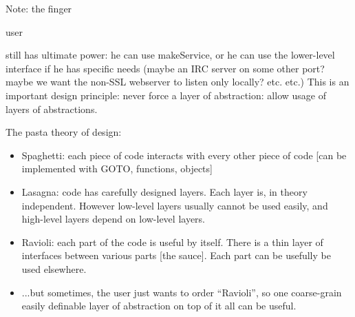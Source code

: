 Note: the finger \begin{em}user\end{em} still has ultimate power: he can use makeService, or he can use the lower-level interface if he has specific needs (maybe an IRC server on some other port? maybe we want the non-SSL webserver to listen only locally?  etc. etc.) This is an important design principle: never force a layer of abstraction: allow usage of layers of abstractions.

The pasta theory of design:\begin{itemize}
\item Spaghetti: each piece of code interacts with every other piece of     code {[}can be implemented with GOTO, functions, objects{]}
\item Lasagna: code has carefully designed layers. Each layer is, in     theory independent. However low-level layers usually cannot be     used easily, and high-level layers depend on low-level layers.
\item Ravioli: each part of the code is useful by itself. There is a thin     layer of interfaces between various parts {[}the sauce{]}. Each part     can be usefully be used elsewhere.
\item ...but sometimes, the user just wants to order ``Ravioli'', so one     coarse-grain easily definable layer of abstraction on top of it all     can be useful.
\end{itemize}

